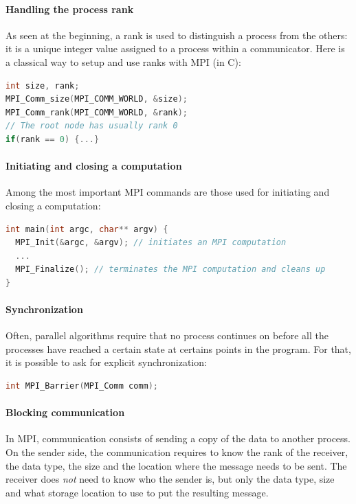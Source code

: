 \documentclass{article}
\begin{document}
\paragraph{Handling the process rank}
As seen at the beginning, a rank is used to distinguish a process from the others: it is a unique integer value assigned to a process within a communicator. Here is a classical way to setup and use ranks with MPI (in C):
\begin{lstlisting}[language=C]
int size, rank;
MPI_Comm_size(MPI_COMM_WORLD, &size);
MPI_Comm_rank(MPI_COMM_WORLD, &rank);
// The root node has usually rank 0
if(rank == 0) {...}
\end{lstlisting}

\paragraph{Initiating and closing a computation}
Among the most important MPI commands are those used for initiating and closing a computation:
\begin{lstlisting}[language=C]
int main(int argc, char** argv) {
  MPI_Init(&argc, &argv); // initiates an MPI computation
  ...
  MPI_Finalize(); // terminates the MPI computation and cleans up
}
\end{lstlisting}

\paragraph{Synchronization}
Often, parallel algorithms require that no process continues on before all the processes have reached a certain state at certains points in the program. For that, it is possible to ask for explicit synchronization:
\begin{lstlisting}[language=C]
int MPI_Barrier(MPI_Comm comm);
\end{lstlisting}

\paragraph{Blocking communication}
In MPI, communication consists of sending a copy of the data to another process. On the sender side, the communication requires to know the rank of the receiver, the data type, the size and the location where the message needs to be sent. The receiver does \textit{not} need to know who the sender is, but only the data type, size and what storage location to use to put the resulting message.
\end{document}
